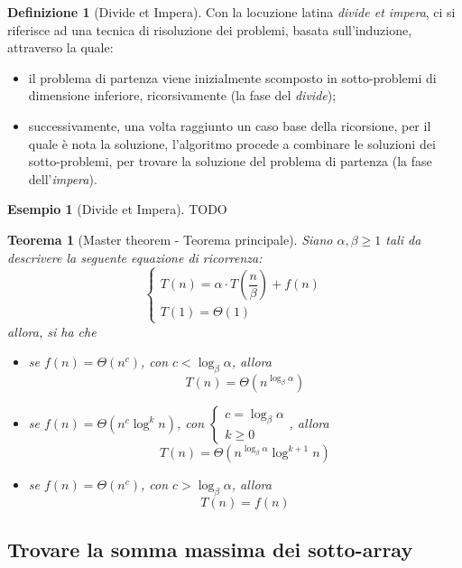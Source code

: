 \documentclass[14pt]{extreport}
\newtheorem{theorem}{Teorema}[subsection]
\theoremstyle{definition}
\newtheorem{definition}{Definizione}[subsection]
\theoremstyle{definition}
\newtheorem{example}{Esempio}[subsection]
\begin{document}
\begin{definition}[Divide et Impera]
    Con la locuzione latina \textit{divide et impera}, ci si riferisce ad una tecnica di risoluzione dei problemi, basata sull'induzione, attraverso la quale:

    \begin{itemize} 
        \item il problema di partenza viene inizialmente scomposto in sotto-problemi di dimensione inferiore, ricorsivamente (la fase del \textit{divide});
        \item successivamente, una volta raggiunto un caso base della ricorsione, per il quale è nota la soluzione, l'algoritmo procede a combinare le soluzioni dei sotto-problemi, per trovare la soluzione del problema di partenza (la fase dell'\textit{impera}).
    \end{itemize}
\end{definition}

\begin{example}[Divide et Impera]
    TODO
\end{example}

\begin{theorem}[Master theorem - Teorema principale]
    \label{master theorem}
    Siano $\alpha, \beta \ge 1$ tali da descrivere la seguente equazione di ricorrenza: $$\left \{ \begin{array}{l} T(n) = \alpha \cdot T\left(\dfrac{n}{\beta}\right) + f(n) \\ T(1) = \Theta(1) \end{array} \right.$$ allora, si ha che
    \begin{itemize}
        \item se $f(n) = \Theta(n^c)$, con $c < \log_{\beta}{\alpha}$, allora $$T(n) = \Theta(n^{\log_{\beta}{\alpha}})$$
        \item se $f(n) = \Theta(n^c \log^k n)$, con $\left \{ \begin{array}{l} c = \log_{\beta}{\alpha} \\ k \ge 0 \end{array} \right.$, allora $$T(n) = \Theta(n^{\log_{\beta}{\alpha}} \log^{k+1} {n})$$
        \item se $f(n) = \Theta(n^c)$, con $c > \log_{\beta}{\alpha}$, allora $$T(n) = f(n)$$
    \end{itemize}
\end{theorem}

\subsection{Trovare la somma massima dei sotto-array}
\end{document}
